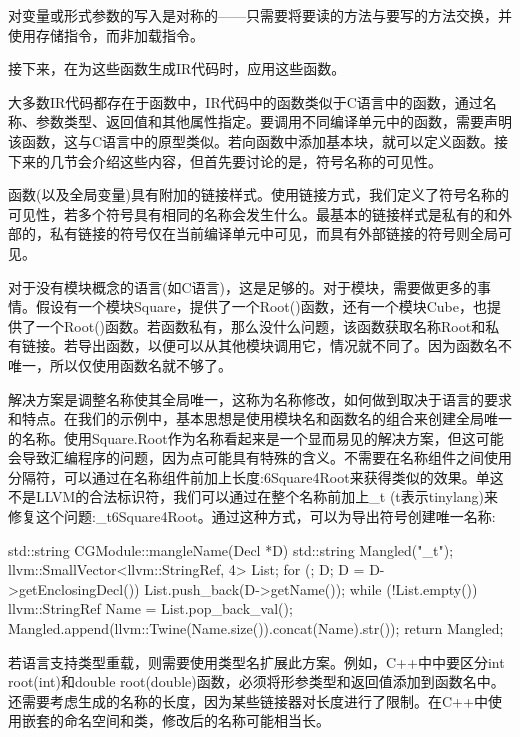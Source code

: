 对变量或形式参数的写入是对称的——只需要将要读的方法与要写的方法交换，并使用存储指令，而非加载指令。

接下来，在为这些函数生成IR代码时，应用这些函数。


大多数IR代码都存在于函数中，IR代码中的函数类似于C语言中的函数，通过名称、参数类型、返回值和其他属性指定。要调用不同编译单元中的函数，需要声明该函数，这与C语言中的原型类似。若向函数中添加基本块，就可以定义函数。接下来的几节会介绍这些内容，但首先要讨论的是，符号名称的可见性。



函数(以及全局变量)具有附加的链接样式。使用链接方式，我们定义了符号名称的可见性，若多个符号具有相同的名称会发生什么。最基本的链接样式是私有的和外部的，私有链接的符号仅在当前编译单元中可见，而具有外部链接的符号则全局可见。

对于没有模块概念的语言(如C语言)，这是足够的。对于模块，需要做更多的事情。假设有一个模块Square，提供了一个Root()函数，还有一个模块Cube，也提供了一个Root()函数。若函数私有，那么没什么问题，该函数获取名称Root和私有链接。若导出函数，以便可以从其他模块调用它，情况就不同了。因为函数名不唯一，所以仅使用函数名就不够了。

解决方案是调整名称使其全局唯一，这称为名称修改，如何做到取决于语言的要求和特点。在我们的示例中，基本思想是使用模块名和函数名的组合来创建全局唯一的名称。使用Square.Root作为名称看起来是一个显而易见的解决方案，但这可能会导致汇编程序的问题，因为点可能具有特殊的含义。不需要在名称组件之间使用分隔符，可以通过在名称组件前加上长度:6Square4Root来获得类似的效果。单这不是LLVM的合法标识符，我们可以通过在整个名称前加上\_t (t表示tinylang)来修复这个问题:\_t6Square4Root。通过这种方式，可以为导出符号创建唯一名称:

\begin{cpp}
std::string CGModule::mangleName(Decl *D) {
    std::string Mangled("_t");
    llvm::SmallVector<llvm::StringRef, 4> List;
    for (; D; D = D->getEnclosingDecl())
        List.push_back(D->getName());
    while (!List.empty()) {
        llvm::StringRef Name = List.pop_back_val();
        Mangled.append(llvm::Twine(Name.size()).concat(Name).str());
    }
    return Mangled;
}
\end{cpp}

若语言支持类型重载，则需要使用类型名扩展此方案。例如，C++中中要区分int root(int)和double root(double)函数，必须将形参类型和返回值添加到函数名中。还需要考虑生成的名称的长度，因为某些链接器对长度进行了限制。在C++中使用嵌套的命名空间和类，修改后的名称可能相当长。

